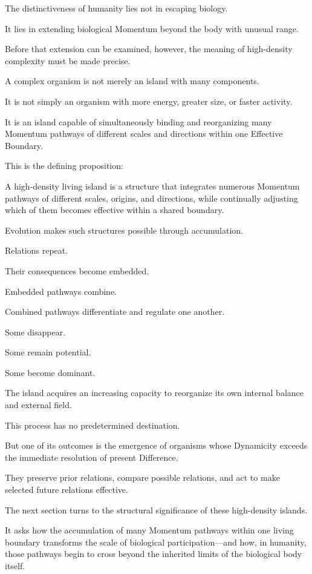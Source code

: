 The distinctiveness of humanity lies not in escaping biology.

It lies in extending biological Momentum beyond the body with unusual range.

Before that extension can be examined, however, the meaning of high-density complexity must be made precise.

A complex organism is not merely an island with many components.

It is not simply an organism with more energy, greater size, or faster activity.

It is an island capable of simultaneously binding and reorganizing many Momentum pathways of different scales and directions within one Effective Boundary.

This is the defining proposition:

A high-density living island is a structure that integrates numerous Momentum pathways of different scales, origins, and directions, while continually adjusting which of them becomes effective within a shared boundary.

Evolution makes such structures possible through accumulation.

Relations repeat.

Their consequences become embedded.

Embedded pathways combine.

Combined pathways differentiate and regulate one another.

Some disappear.

Some remain potential.

Some become dominant.

The island acquires an increasing capacity to reorganize its own internal balance and external field.

This process has no predetermined destination.

But one of its outcomes is the emergence of organisms whose Dynamicity exceeds the immediate resolution of present Difference.

They preserve prior relations, compare possible relations, and act to make selected future relations effective.

The next section turns to the structural significance of these high-density islands.

It asks how the accumulation of many Momentum pathways within one living boundary transforms the scale of biological participation—and how, in humanity, those pathways begin to cross beyond the inherited limits of the biological body itself.

